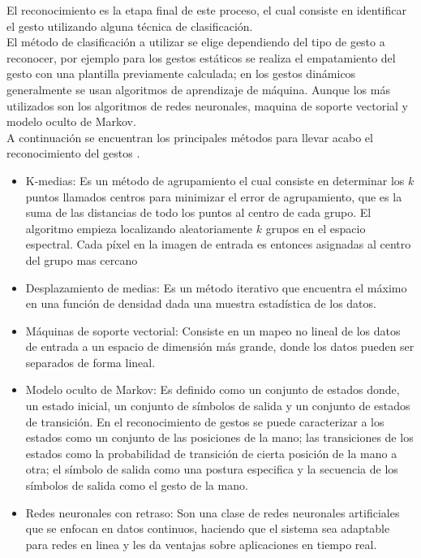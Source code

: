 El reconocimiento es la etapa final de este proceso, el cual consiste en identificar el gesto utilizando alguna técnica de clasificación.\\
El método de clasificación a utilizar se elige dependiendo del tipo de gesto a reconocer, por ejemplo para los gestos estáticos se realiza el empatamiento del gesto con una plantilla previamente calculada; en los gestos dinámicos generalmente  se usan algoritmos de aprendizaje de máquina. Aunque los más utilizados son los algoritmos de redes neuronales, maquina de soporte vectorial y modelo oculto de Markov.\\ 
A continuación se encuentran los principales métodos para llevar acabo el reconocimiento del gestos \citep{Rautaray2012}. 
\begin{itemize}
	\item K-medias: Es un método de agrupamiento el cual consiste en determinar los $k$ puntos llamados centros para minimizar el error de agrupamiento, que es la suma de las distancias de todo los puntos al centro de cada grupo. El algoritmo empieza localizando aleatoriamente $k$ grupos en el espacio espectral. Cada p\'ixel en la imagen de entrada es entonces asignadas al centro del grupo mas cercano  
	\item Desplazamiento de medias: Es un método iterativo que encuentra el máximo en una función de densidad dada una muestra estadística de los datos.
	\item Máquinas de soporte vectorial: Consiste en un mapeo no lineal de los datos de entrada a un espacio de dimensi\'on m\'as grande, donde los datos pueden ser separados de forma lineal.  
	\item Modelo oculto de Markov: Es definido como un conjunto de estados donde, un estado inicial, un conjunto de símbolos de salida y un conjunto de estados de transición. En el reconocimiento de gestos se puede caracterizar a    los estados como un conjunto de las posiciones de la mano; las  transiciones de los estados como la probabilidad de transición de cierta posición de la mano a otra; el símbolo de salida como una postura especifica y la secuencia de los símbolos de salida como  el gesto de la mano.   
	\item Redes neuronales con retraso: Son una clase de redes neuronales artificiales que se enfocan en datos continuos, haciendo que el sistema sea adaptable para redes en linea y les da ventajas sobre aplicaciones en tiempo real. 
\end{itemize}  


